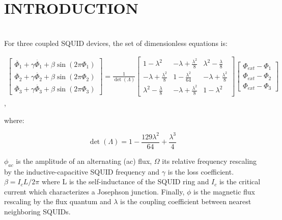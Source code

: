\documentclass[aps,pre,reprint,groupedaddress]{revtex4-1}
\begin{document}
\section{INTRODUCTION}
\label{sec:introduction}

\section{} 

For three coupled SQUID devices, the set of dimensionless equations is:

\begin{widetext}
	\begin{gather}
	\begin{bmatrix} \ddot{\varPhi_{1}} +\gamma \dot{\varPhi_{1}} +\beta \sin(2\pi \varPhi_{1}) \\[2ex] \ddot{\varPhi_{2}} +\gamma \dot{\varPhi_{2}} +\beta \sin(2\pi \varPhi_{2}) \\[2ex] \ddot{\varPhi_{3}} +\gamma \dot{\varPhi_{3}} +\beta \sin(2\pi \varPhi_{3}) \end{bmatrix}
	=
	\frac{1}{\det(\varLambda)}
	\begin{bmatrix}
	1-\lambda^{2} & -\lambda+\frac{\lambda^{2}}{8} & \lambda^{2} -\frac{\lambda}{8}  \\[2ex]
	-\lambda+\frac{\lambda^{2}}{8} & 1-\frac{\lambda^{2}}{64} &  -\lambda+\frac{\lambda^{2}}{8} \\[2ex]
	\lambda^{2} -\frac{\lambda}{8}  & -\lambda+\frac{\lambda^{2}}{8} & 1-\lambda^{2}
	\end{bmatrix}
	\begin{bmatrix} \varPhi_{ext} - \varPhi_{1} \\[2ex]  \varPhi_{ext} - \varPhi_{2} \\[2ex] \varPhi_{ext} - \varPhi_{3} \end{bmatrix}
	\end{gather},
\end{widetext}
where:

\begin{equation} \label{}
\det(\Lambda) = 1 - \frac{129 \lambda^{2}}{64} +\frac{\lambda^{3}}{4}
\end{equation}

$\phi_{ac}$ is the amplitude of an alternating (ac) flux, $\Omega$ its relative frequency rescaling by the inductive-capacitive SQUID frequency and $\gamma$ is the loss coefficient. $\beta=I_{c}L/2\pi$ where L is the self-inductance of the SQUID ring and $I_{c}$ is the critical current which characterizes a Josephson junction. Finally, $\phi$ is the magnetic flux rescaling by the flux quantum and $\lambda$ is the coupling coefficient between nearest neighboring SQUIDs.
\end{document}
